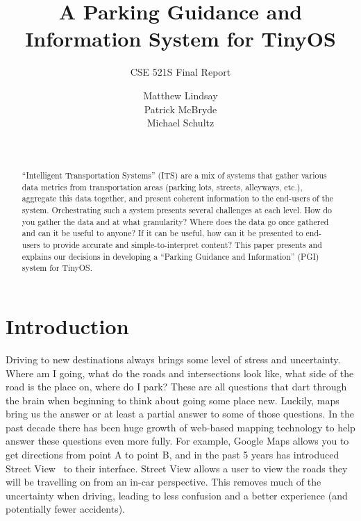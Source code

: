 \documentclass{acm_proc}
\begin{document}
\title{A Parking Guidance and Information System for TinyOS}
\subtitle{CSE 521S Final Report}

\author{
\alignauthor Matthew Lindsay\\
\alignauthor Patrick McBryde\\
\alignauthor Michael Schultz\\
\and
{}\\
}

\maketitle

\begin{abstract}
``Intelligent Transportation Systems'' (ITS) are a mix of systems that
gather various data metrics from transportation areas (parking lots,
streets, alleyways, etc.), aggregate this data together, and present
coherent information to the end-users of the system.
Orchestrating such a system presents several challenges at each level.
How do you gather the data and at what granularity?
Where does the data go once gathered and can it be useful to anyone?
If it can be useful, how can it be presented to end-users to provide
accurate and simple-to-interpret content?
This paper presents and explains our decisions in developing a ``Parking
Guidance and Information'' (PGI) system for TinyOS.
\end{abstract}

\section{Introduction}

Driving to new destinations always brings some level of stress and
uncertainty.
Where am I going, what do the roads and intersections look like, what side
of the road is the place on, where do I park?
These are all questions that dart through the brain when beginning to think
about going some place new.
Luckily, maps bring us the answer or at least a partial answer to some of
those questions.
In the past decade there has been huge growth of web-based mapping
technology to help answer these questions even more fully.
For example, Google Maps allows you to get directions from point A to point
B, and in the past 5 years has introduced Street
View~\cite{vincent:streetview} to their interface.
Street View allows a user to view the roads they will be travelling on from
an in-car perspective.
This removes much of the uncertainty when driving, leading to less
confusion and a better experience (and potentially fewer accidents).
\end{document}
